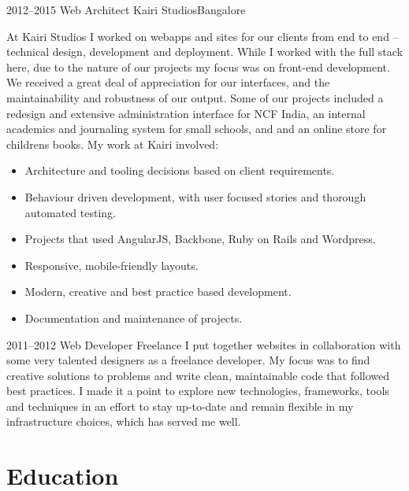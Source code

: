 \documentclass[11pt,a4paper,sans]{moderncv}        %
\begin{document}
\cventry
{\textcolor{light}{2012--2015}}
{Web Architect}
{}
{Kairi Studios}{Bangalore}
{At Kairi Studios I worked on webapps and sites for our clients from end to end -- technical design, development and deployment. While I worked with the full stack here, due to the nature of our projects my focus was on front-end development. We received a great deal of appreciation for our interfaces, and the maintainability and robustness of our output.
\endgraf
\vspace{6pt}
Some of our projects included a redesign and extensive administration interface for NCF India, an internal academics and journaling system for small schools, and and an online store for childrens books. My work at Kairi involved:
\vspace{6pt}
\begin{itemize}
  \item Architecture and tooling decisions based on client requirements.
  \item Behaviour driven development, with user focused stories and thorough automated testing.
  \item Projects that used AngularJS, Backbone, Ruby on Rails and Wordpress.
  \item Responsive, mobile-friendly layouts.
  \item Modern, creative and best practice based development.
  \item Documentation and maintenance of projects.
\end{itemize}}

\vspace{8pt}

\cventry
{\textcolor{light}{2011--2012}}
{Web Developer}
{}
{Freelance}{}
{I put together websites in collaboration with some very talented designers as a freelance developer. My focus was to find creative solutions to problems and write clean, maintainable code that followed best practices. I made it a point to explore new technologies, frameworks, tools and techniques in an effort to stay up-to-date and remain flexible in my infrastructure choices, which has served me well.}

\vspace{6pt}


\section{Education}

\vspace{6pt}
\end{document}
